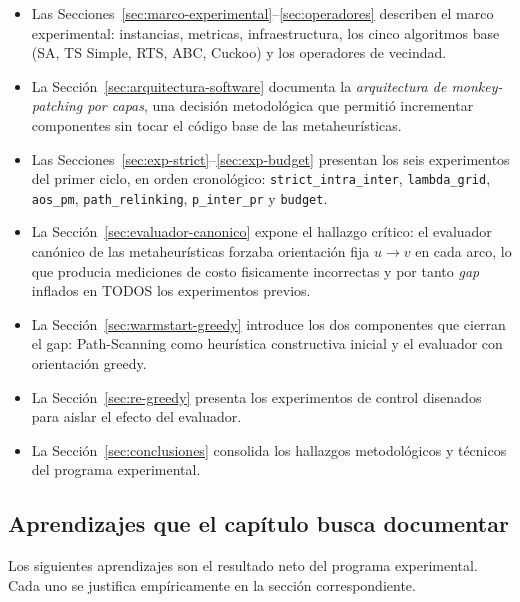 \documentclass[11pt,a4paper]{article}
\theoremstyle{definition}
\theoremstyle{remark}
\begin{document}
\begin{itemize}
\item Las Secciones~\ref{sec:marco-experimental}--\ref{sec:operadores}
  describen el marco experimental: instancias, metricas,
  infraestructura, los cinco algoritmos base (SA, TS Simple, RTS, ABC,
  Cuckoo) y los operadores de vecindad.
\item La Sección~\ref{sec:arquitectura-software} documenta la
  \emph{arquitectura de monkey-patching por capas}, una decisión
  metodológica que permitió incrementar componentes sin tocar el
  código base de las metaheurísticas.
\item Las Secciones~\ref{sec:exp-strict}--\ref{sec:exp-budget}
  presentan los seis experimentos del primer ciclo, en orden
  cronológico: \texttt{strict\_intra\_inter},
  \texttt{lambda\_grid}, \texttt{aos\_pm}, \texttt{path\_relinking},
  \texttt{p\_inter\_pr} y \texttt{budget}.
\item La Sección~\ref{sec:evaluador-canonico} expone el hallazgo
  crítico: el evaluador canónico de las metaheurísticas forzaba
  orientación fija $u \to v$ en cada arco, lo que producia
  mediciones de costo fisicamente incorrectas y por tanto \emph{gap}
  inflados en TODOS los experimentos previos.
\item La Sección~\ref{sec:warmstart-greedy} introduce los dos
  componentes que cierran el gap: Path-Scanning como heurística
  constructiva inicial y el evaluador con orientación greedy.
\item La Sección~\ref{sec:re-greedy} presenta los experimentos de
  control disenados para aislar el efecto del evaluador.
\item La Sección~\ref{sec:conclusiones} consolida los hallazgos
  metodológicos y técnicos del programa experimental.
\end{itemize}

\subsection{Aprendizajes que el capítulo busca documentar}

Los siguientes aprendizajes son el resultado neto del programa
experimental. Cada uno se justifica empíricamente en la sección
correspondiente.
\end{document}
